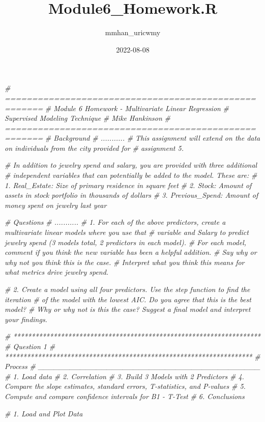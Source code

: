 \documentclass[
]{article}
\title{Module6\_Homework.R}
\author{mmhan\_uricwmy}
\date{2022-08-08}
\newenvironment{Shaded}{\begin{snugshade}}{\end{snugshade}}
\newcommand{\CommentTok}[1]{\textcolor[rgb]{0.56,0.35,0.01}{\textit{#1}}}
\begin{document}
\maketitle

\begin{Shaded}
\begin{Highlighting}[]
\CommentTok{\# =====================================================}
\CommentTok{\# Module 6 Homework {-} Multivariate Linear Regression}
\CommentTok{\#                     Supervised Modeling Technique}
\CommentTok{\# Mike Hankinson}
\CommentTok{\# =====================================================}
\CommentTok{\# Background}
\CommentTok{\# ...........}
\CommentTok{\# This assignment will extend on the data on individuals from the city provided for }
\CommentTok{\# assignment 5. }

\CommentTok{\# In addition to jewelry spend and salary, you are provided with three additional }
\CommentTok{\# independent variables that can potentially be added to the model. These are: }
    \CommentTok{\# 1. Real\_Estate: Size of primary residence in square feet }
    \CommentTok{\# 2. Stock: Amount of assets in stock portfolio in thousands of dollars }
    \CommentTok{\# 3. Previous\_Spend: Amount of money spent on jewelry last year }

\CommentTok{\# Questions}
\CommentTok{\# ...........}
\CommentTok{\# 1.  For each of the above predictors, create a multivariate linear models where you use that }
\CommentTok{\#     variable and Salary to predict jewelry spend (3 models total, 2 predictors in each model). }
\CommentTok{\#     For each model, comment if you think the new variable has been a helpful addition. }
\CommentTok{\#     Say why or why not you think this is the case. }
\CommentTok{\#     Interpret what you think this means for what metrics drive jewelry spend. }

\CommentTok{\# 2.    Create a model using all four predictors. Use the step function to find the iteration }
\CommentTok{\#     of the model with the lowest AIC. Do you agree that this is the best model? }
\CommentTok{\#     Why or why not is this the case? Suggest a final model and interpret your findings. }
 
\CommentTok{\# ********************************************************************    }
\CommentTok{\# Question 1}
\CommentTok{\# ********************************************************************}
\CommentTok{\# Process}
\CommentTok{\# \_\_\_\_\_\_\_\_\_\_\_\_\_\_\_\_\_\_\_\_\_\_\_\_\_\_\_\_\_\_\_\_\_\_\_\_\_\_\_\_\_\_}
\CommentTok{\# 1. Load data}
\CommentTok{\# 2. Correlation}
\CommentTok{\# 3. Build 3 Models with 2 Predictors}
\CommentTok{\# 4. Compare the slope estimates, standard errors, T{-}statistics, and P{-}values}
\CommentTok{\# 5. Compute and compare confidence intervals for B1 {-} T{-}Test}
\CommentTok{\# 6. Conclusions}

\CommentTok{\# 1. Load and Plot Data}
\end{Highlighting}
\end{Shaded}
\end{document}
